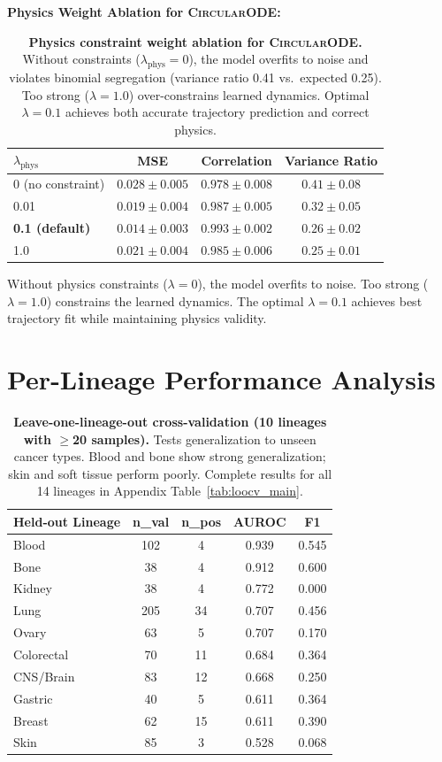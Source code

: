 \documentclass[sigconf,anonymous]{acmart}
\newcommand{\circularode}{\textsc{CircularODE}}
\begin{document}
\textbf{Physics Weight Ablation for \circularode{}:}

\begin{table}[h]
\caption{\textbf{Physics constraint weight ablation for \circularode{}.} Without constraints ($\lambda_{\text{phys}}=0$), the model overfits to noise and violates binomial segregation (variance ratio 0.41 vs.\ expected 0.25). Too strong ($\lambda=1.0$) over-constrains learned dynamics. Optimal $\lambda=0.1$ achieves both accurate trajectory prediction and correct physics.}
\centering
\small
\begin{tabular}{@{}lccc@{}}
\toprule
$\lambda_{\text{phys}}$ & MSE & Correlation & Variance Ratio \\
\midrule
0 (no constraint) & $0.028 \pm 0.005$ & $0.978 \pm 0.008$ & $0.41 \pm 0.08$ \\
0.01 & $0.019 \pm 0.004$ & $0.987 \pm 0.005$ & $0.32 \pm 0.05$ \\
\textbf{0.1 (default)} & $\mathbf{0.014 \pm 0.003}$ & $\mathbf{0.993 \pm 0.002}$ & $\mathbf{0.26 \pm 0.02}$ \\
1.0 & $0.021 \pm 0.004$ & $0.985 \pm 0.006$ & $0.25 \pm 0.01$ \\
\bottomrule
\end{tabular}
\end{table}

Without physics constraints ($\lambda=0$), the model overfits to noise. Too strong ($\lambda=1.0$) constrains the learned dynamics. The optimal $\lambda=0.1$ achieves best trajectory fit while maintaining physics validity.

\section{Per-Lineage Performance Analysis}
\label{app:lineage}

\begin{table}[h]
\caption{\textbf{Leave-one-lineage-out cross-validation (10 lineages with $\geq$20 samples).} Tests generalization to unseen cancer types. Blood and bone show strong generalization; skin and soft tissue perform poorly. Complete results for all 14 lineages in Appendix Table~\ref{tab:loocv_main}.}
\centering
\small
\begin{tabular}{@{}lcccc@{}}
\toprule
Held-out Lineage & n\_val & n\_pos & AUROC & F1 \\
\midrule
Blood & 102 & 4 & 0.939 & 0.545 \\
Bone & 38 & 4 & 0.912 & 0.600 \\
Kidney & 38 & 4 & 0.772 & 0.000 \\
Lung & 205 & 34 & 0.707 & 0.456 \\
Ovary & 63 & 5 & 0.707 & 0.170 \\
Colorectal & 70 & 11 & 0.684 & 0.364 \\
CNS/Brain & 83 & 12 & 0.668 & 0.250 \\
Gastric & 40 & 5 & 0.611 & 0.364 \\
Breast & 62 & 15 & 0.611 & 0.390 \\
Skin & 85 & 3 & 0.528 & 0.068 \\
\bottomrule
\end{tabular}
\end{table}
\end{document}
